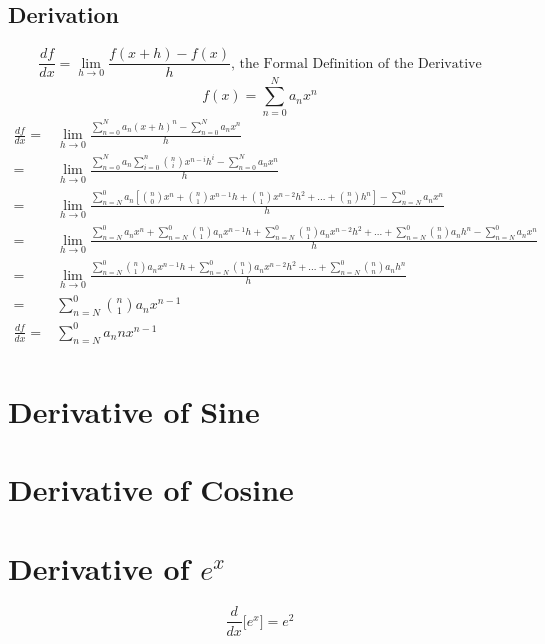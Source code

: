\subsection{Derivation}
\[\frac{df}{dx} = \lim_{h\to0}\frac{f(x+h) -f(x)}{h} \text{, the Formal Definition of the Derivative}\]
\[f(x) = \sum\limits_{n=0}^N{a_n x^n}\]
\begin{align*}
\frac{df}{dx} =&  \lim_{h\to0}\frac{\sum\limits_{n=0}^N{a_n (x+h)^n} - \sum\limits_{n=0}^N{a_n x^n}}{h} \\
=&  \lim_{h\to0}\frac{\sum\limits_{n=0}^N{a_n \sum\limits_{i=0}^n{{n \choose i}x^{n-i}h^i}} - \sum\limits_{n=0}^N{a_n x^n}}{h} \\
=&  \lim_{h\to0}\frac{
\sum\limits_{n=N}^0{a_n [{n\choose0}x^n + {n\choose1}x^{n-1}h+ {n\choose1}x^{n-2}h^2 + ... + {n\choose n}h^n]} - \sum\limits_{n=N}^0{a_n x^n}}
{h} \\
=&  \lim_{h\to0}\frac{\sum\limits_{n=N}^0{a_n x^n} + \sum\limits_{n=N}^0{{n\choose1} a_n x^{n-1}h} + \sum\limits_{n=N}^0{{n\choose1} a_n x^{n-2}h^2 + ... + \sum\limits_{n=N}^0{{n\choose n} a_n h^n}} - \sum\limits_{n=N}^0{a_n x^n}}{h} \\
=&  \lim_{h\to0} \frac{ 
\sum\limits_{n=N}^0{ {n\choose1} a_n x^{n-1}h   } + 
\sum\limits_{n=N}^0{ {n\choose1} a_n x^{n-2}h^2 } + ... + 
\sum\limits_{n=N}^0{ {n\choose n}a_n      h^n}  }{h} \\
=& \sum\limits_{n=N}^0{ {n\choose1} a_n x^{n-1}  }\\
\frac{df}{dx} =& \sum\limits_{n=N}^0{ a_n n x^{n-1}  }\\
\end{align*}

\section{Derivative of Sine}
\section{Derivative of Cosine}

\section{Derivative of $e^x$}
\[ \frac{d}{dx}\bigg[e^x \bigg] = e^2 \]

